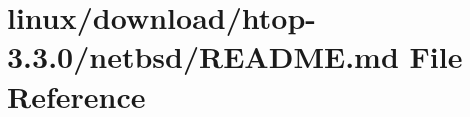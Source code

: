 \hypertarget{linux_2download_2htop-3_83_80_2netbsd_2README_8md}{}\section{linux/download/htop-\/3.3.0/netbsd/\+R\+E\+A\+D\+ME.md File Reference}
\label{linux_2download_2htop-3_83_80_2netbsd_2README_8md}
